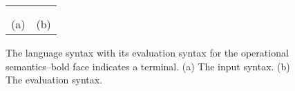 \newsavebox{\boxEvalSyntax}
\begin{lrbox}{\boxEvalSyntax}
\begin{minipage}[c]{0.3\linewidth}
\cfgstart
{}
\cfgrule{\epsnd}{\cfgt{\mt}\
   \cfgor\lp\cfgnt{\epsnd}~\lb\lp\cfgt{\num},\cfgt{\num}\rp~$\rightarrow$~\cfgt{\num}\rb\rp}
\cfgrule{\eprcv}{\cfgt{\mt}\
   \cfgor\lp\cfgnt{\eprcv}~\lb\lp\cfgt{\num},\cfgt{\num}\rp~$\rightarrow$~\cfgt{\num}\rb\rp}
\cfgrule{rcv}{\lp\lb\cfgt{\aid}~\cfgt{\num}~\cfgt{\num}\rb\ \ldots\rp}
\cfgrule{\epbarrier}{\cfgt{\mt}\
   \cfgor\lp\cfgnt{\epbarrier}~\lb\cfgnt{\aid}~$\rightarrow$~\cfgt{\num}\rb\rp}
\cfgend
\end{minipage}
\end{lrbox}

\begin{figure}
\begin{center}
\setlength{\tabcolsep}{15pt}
\begin{tabular}{cc}
\scalebox{0.75}{\usebox{\boxLangSyntax}}
&
\scalebox{0.75}{\usebox{\boxEvalSyntax}}
\\ \\
(a) & (b)
\end{tabular}
\end{center}
\caption{The language syntax with its evaluation syntax for the operational semantics--bold face indicates a terminal. (a) The input syntax. (b) The evaluation syntax.}
\label{fig:expr:stx}
\end{figure}



